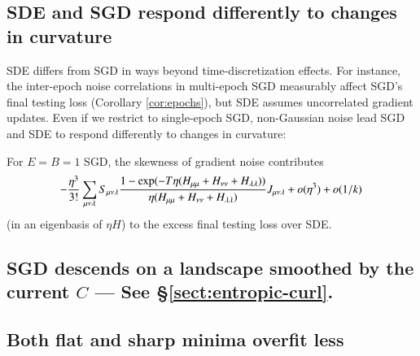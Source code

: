         \subsection{SDE and SGD respond differently to changes in curvature}
            SDE differs from SGD in ways beyond time-discretization effects.
            For instance, the inter-epoch noise correlations in multi-epoch SGD
            measurably affect SGD's final testing loss (Corollary
            \ref{cor:epochs}), but SDE assumes uncorrelated gradient updates.
            Even if we restrict to single-epoch SGD, 
            non-Gaussian noise lead SGD and SDE to respond differently to
            changes in curvature: 
            \begin{cor}[$\sdia{c(012-3)(03-13-23)}$] \label{cor:vsode}
                For $E=B=1$ SGD, the skewness of gradient noise contributes  
                \crunch
                \begin{align*}
                    -\frac{\eta^3}{3!}
                    \sum_{\mu\nu\lambda}
                        S_{\mu\nu\lambda}
                        \frac{
                            1 - \exp(-T\eta (H_{\mu\mu} + H_{\nu\nu} + H_{\lambda\lambda}))
                        }{
                            \eta (H_{\mu\mu} + H_{\nu\nu} + H_{\lambda\lambda})
                        }
                        J_{\mu\nu\lambda}
                        + o(\eta^3)
                        + o(1/k)
                        \squash
                \end{align*}
                (in an
                eigenbasis of $\eta H$)
                to the excess final testing loss over SDE.
            \end{cor}


       
        \subsection{SGD descends on a landscape smoothed by the current $C$ {\rm --- See \S\ref{sect:entropic-curl}.}}
        \subsection{Both flat and sharp minima overfit less}
            \label{subsect:curvature-and-overfitting}%

